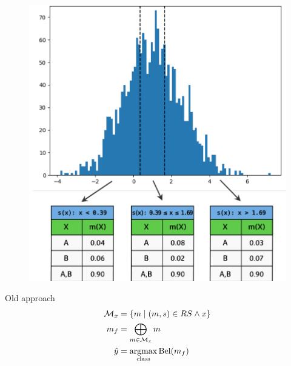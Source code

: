 \documentclass[aspectratio=169]{beamer}
\begin{document}
\begin{frame}
\begin{figure}
    \centering
    \includegraphics[width=0.45\linewidth]{../../fig/image.png}
    \label{fig:image}
\end{figure}
    
\end{frame}



\begin{frame}{Old approach}
\begin{align*}
\mathcal{M}_x &= \left\{ m \mid (m, s) \in RS \land x \right\} \\
m_f &= \bigoplus_{m \in \mathcal{M}_x} m \\
\hat{y} &= \underset{{\rm class}}{\mathrm{argmax}} \, {\rm Bel}(m_f)
\end{align*}

\end{frame}
\end{document}

